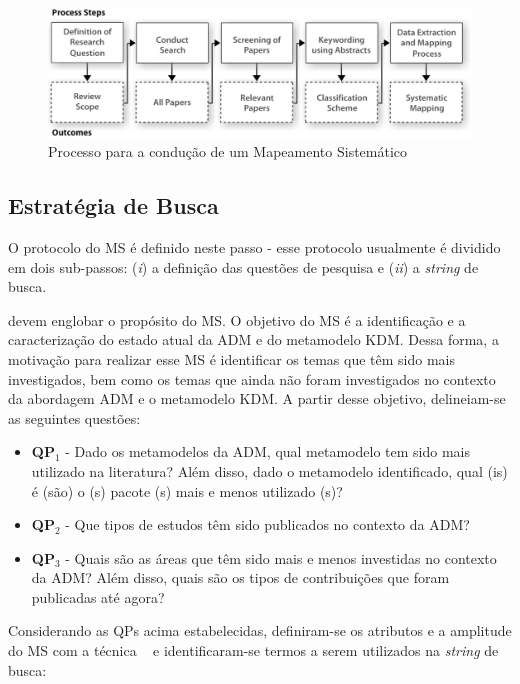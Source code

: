 \begin{figure}[h]
 \caption{Processo para a condução de um Mapeamento Sistemático}
 \label{fig:all_steps_MS}
 \centering
 \includegraphics[scale=0.3]{images/systematic_mapping_process}
\end{figure}

\subsection{Estratégia de Busca}

O protocolo do MS é definido neste passo - esse protocolo usualmente é dividido em dois sub-passos: (\textit{i}) a definição das questões de pesquisa e (\textit{ii}) a \textit{string} de busca. 

 devem englobar o propósito do MS. O objetivo do MS é a identificação e a caracterização do estado atual da ADM e do metamodelo KDM. Dessa forma, a motivação para realizar esse MS é identificar os temas que têm sido mais investigados, bem como os temas que ainda não foram investigados no contexto da abordagem ADM e o metamodelo KDM. A partir desse objetivo, delineiam-se as seguintes questões:

\begin{itemize}
\item \textbf{QP$_1$} - Dado os metamodelos da ADM, qual metamodelo tem sido mais utilizado na literatura? Além disso, dado o metamodelo identificado, qual (is) é (são) o (s) pacote (s) mais e menos utilizado (s)?
\item \textbf{QP$_2$} - Que tipos de estudos têm sido publicados no contexto da ADM?
\item \textbf{QP$_3$} - Quais são as áreas que têm sido mais e menos investidas no contexto da ADM? Além disso, quais são os tipos de contribuições que foram publicadas até agora?
\end{itemize}

Considerando as QPs acima estabelecidas, definiram-se os atributos e a amplitude do MS com a técnica ~\cite{Kitchenham_2010} e identificaram-se termos a serem utilizados na \textit{string} de busca:

